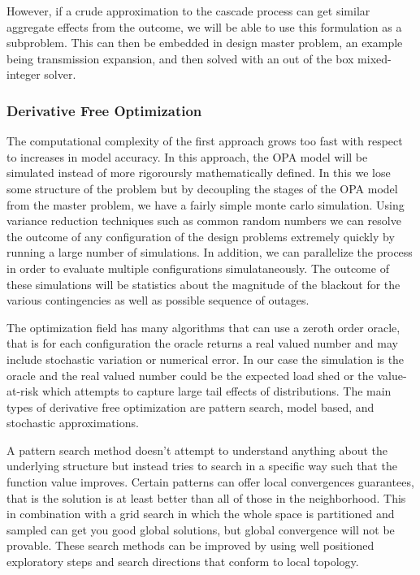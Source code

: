  However, if a crude approximation to the cascade process can get similar aggregate effects from the outcome, we will be able to use this formulation as a subproblem.  This can then be embedded in design master problem, an example being transmission expansion, and then solved with an out of the box mixed-integer solver.

\subsubsection{Derivative Free Optimization}
The computational complexity of the first approach grows too fast with respect to increases in model accuracy.  In this approach, the OPA model will be simulated instead of more rigoroursly mathematically defined.  In this we lose some structure of the problem but by decoupling the stages of the OPA model from the master problem, we have a fairly simple monte carlo simulation.  Using variance reduction techniques such as common random numbers we can resolve the outcome of any configuration of the design problems extremely quickly by running a large number of simulations.  In addition, we can parallelize the process in order to evaluate multiple configurations simulataneously.  The outcome of these simulations will be statistics about the magnitude of the blackout for the various contingencies as well as possible sequence of outages.

The optimization field has many algorithms that can use a zeroth order oracle, that is for each configuration the oracle returns a real valued number and may include stochastic variation or numerical error.  In our case the simulation is the oracle and the real valued number could be the expected load shed or the value-at-risk which attempts to capture large tail effects of distributions.  The main types of derivative free optimization are pattern search, model based, and stochastic approximations.  

A pattern search method doesn't attempt to understand anything about the underlying structure but instead tries to search in a specific way such that the function value improves.  Certain patterns can offer local convergences guarantees, that is the solution is at least better than all of those in the neighborhood.  This in combination with a grid search in which the whole space is partitioned and sampled can get you good global solutions, but global convergence will not be provable.  These search methods can be improved by using well positioned exploratory steps and search directions that conform to local topology.

